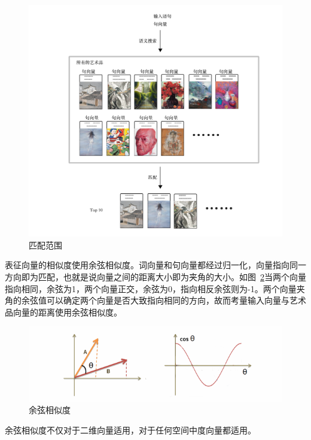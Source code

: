 \begin{figure}[!htbp]
\centering
\includegraphics[width=\linewidth,keepaspectratio]{data/chapter-1/搜索.jpg}
\caption{匹配范围}
\label{figure:搜索}
\end{figure}

表征向量的相似度使用余弦相似度。词向量和句向量都经过归一化，向量指向同一方向即为匹配，也就是说向量之间的距离大小即为夹角的大小。如图~\ref{figure:余弦相似度}当两个向量指向相同，余弦为1，两个向量正交，余弦为0，指向相反余弦则为-1。两个向量夹角的余弦值可以确定两个向量是否大致指向相同的方向，故而考量输入向量与艺术品向量的距离使用余弦相似度。\cite{DBLP:journals/corr/abs-1802-09914}

\begin{figure}[!htbp]
\centering
\includegraphics[width=\linewidth,keepaspectratio]{data/chapter-1/1-1.png}
\caption{余弦相似度}
\label{figure:余弦相似度}
\end{figure}

余弦相似度不仅对于二维向量适用，对于任何空间中度向量都适用。

